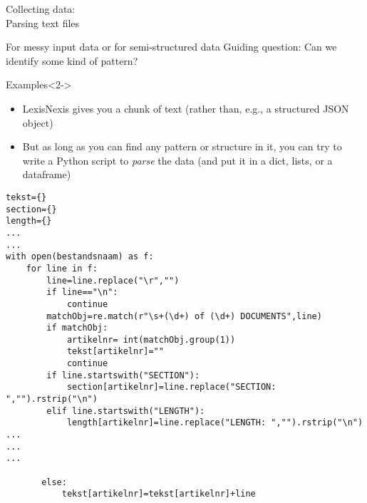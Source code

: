 \documentclass[compress]{beamer}
\begin{document}
\begin{frame}
	Collecting data:\\
	Parsing text files
\end{frame}

\begin{frame}{For messy input data or for semi-structured data}
	Guiding question: Can we identify some kind of pattern?
	\begin{block}{Examples}<2->
		\begin{itemize}
			\item<3-> LexisNexis gives you a chunk of text (rather than, e.g., a structured JSON object)
			\item<3-> But as long as you can find any pattern or structure in it, you can try to write a Python script to \emph{parse} the data (and put it in a dict, lists, or a dataframe)
		\end{itemize}
	\end{block}
\end{frame}

{
	\begin{frame}[plain]
	\end{frame}
	\begin{frame}[plain]
	\end{frame}	
}
	
\begin{frame}
	\tiny
\begin{lstlisting}[basicstyle=\tiny]
tekst={}
section={}
length={}
...
...
with open(bestandsnaam) as f:
    for line in f:
        line=line.replace("\r","")
        if line=="\n":
            continue
        matchObj=re.match(r"\s+(\d+) of (\d+) DOCUMENTS",line)
        if matchObj:
            artikelnr= int(matchObj.group(1))
            tekst[artikelnr]=""
            continue
        if line.startswith("SECTION"):
            section[artikelnr]=line.replace("SECTION: ","").rstrip("\n")
        elif line.startswith("LENGTH"):
            length[artikelnr]=line.replace("LENGTH: ","").rstrip("\n")
...
...
...

       else:
           tekst[artikelnr]=tekst[artikelnr]+line
\end{lstlisting}

\end{frame}
	




\begin{frame}[plain]
    \printbibliography
\end{frame}
\end{document}
